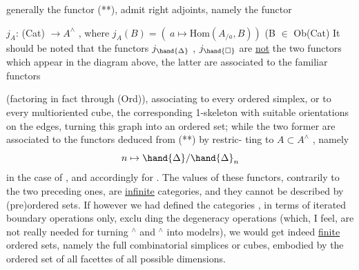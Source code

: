 
generally the functor (**), admit right adjoints, namely the functor


$j_A$: \quad (Cat) $\longrightarrow A^\wedge$ \quad , \quad where \quad $j_A(B) = (\ a \mapsto \mathrm{Hom}(A_{/a},B))$ \quad (B $\in$ Ob(Cat)
It should be noted that the functors \quad $j_{\hand{\Delta}}$ , $j_{\hand{\square}}$ are \uline{not} the two functors \hand{$\alpha,\beta$}
 which appear in the diagram above, \quad the latter are associated
to the familiar functors

\margin{(***)} 

(factoring in fact through (Ord)), associating to every ordered simplex,
or to every multioriented cube, \quad the corresponding 1-skeleton with suitable
orientations on the edges, turning  this graph into an ordered set; \quad while
the two former are associated to the functors deduced from (**) by restric-%
ting to $A \subset A^\wedge$ , \quad namely
\[ n \mapsto \hand{\Delta}/\hand{\Delta}_n \]
in the case of \hand{$\Delta$}, \quad and accordingly for \hand{$\square$}. \quad The values of these functors,
contrarily to the two preceding ones, \quad are \uline{infinite} categories, \quad and they
cannot be described by  (pre)ordered sets. \quad If however we had defined
the categories \hand{$\Delta$} , \hand{$\square$} \quad in terms of iterated boundary operations only, \quad exclu%
ding the degeneracy operations (which, \quad I feel, \quad are not really needed for
turning \hand{$\Delta$}$^\wedge$ and \hand{$\square$}$^\wedge$ into modelrs), \quad we would get indeed \uline{finite} ordered
sets, \quad namely the full combinatorial simplices or cubes,  embodied by the
ordered set of all  facettes of all possible dimensions.

